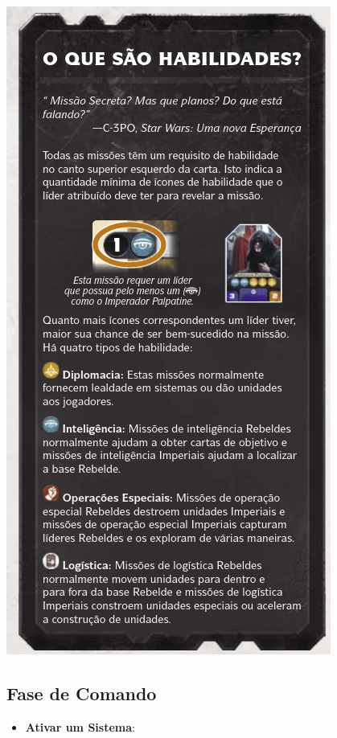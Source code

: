 \documentclass[11pt]{article}
\begin{document}
\begin{center}
\includegraphics[width=.9\linewidth]{./skills.png}
\end{center}

\subsection{Fase de Comando}
\label{sec:org8d0b092}

\begin{itemize}
\item \textbf{Ativar um Sistema}:
\end{itemize}
\end{document}

